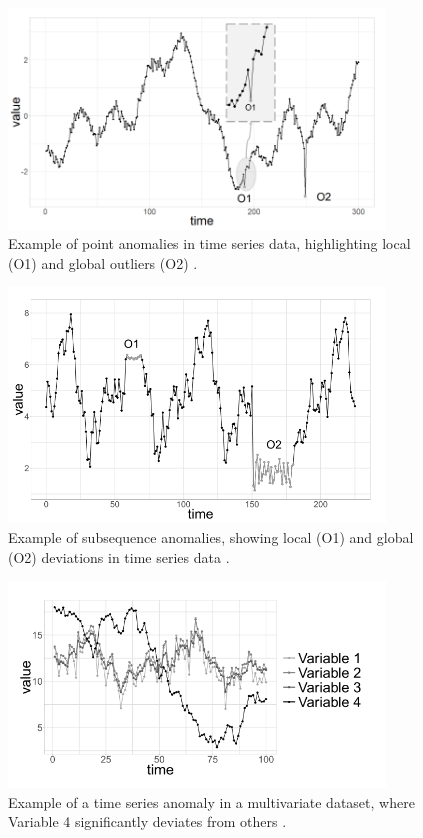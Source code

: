 \begin{figure}[H]
    \centering
    \includegraphics[width=10cm]{Cap2_LitReview/point_anomaly.png}
    \caption{Example of point anomalies in time series data, highlighting local (O1) and global outliers (O2) \cite{Blazquez-Garcia_Conde_Mori_Lozano_2021}.}
    \label{fig:point_anomaly}
\end{figure}

\begin{figure}[H]
    \centering
    \includegraphics[width=10cm]{Cap2_LitReview/subseq_anomaly.png}
    \caption{Example of subsequence anomalies, showing local (O1) and global (O2) deviations in time series data \cite{Blazquez-Garcia_Conde_Mori_Lozano_2021}.}
    \label{fig:subsequence_anomaly}
\end{figure}

\begin{figure}[H]
    \centering
    \includegraphics[width=10cm]{Cap2_LitReview/TS_anomaly.png}
    \caption{Example of a time series anomaly in a multivariate dataset, where Variable 4 significantly deviates from others \cite{Blazquez-Garcia_Conde_Mori_Lozano_2021}.}
    \label{fig:Time_series_anomaly}
\end{figure}

